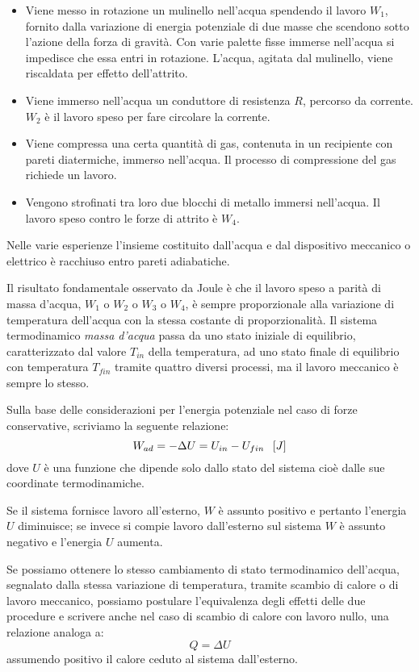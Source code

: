 \documentclass[class=book, crop=false, oneside, 12pt]{standalone}
\begin{document}
\begin{itemize}
    \item Viene messo in rotazione un mulinello nell'acqua spendendo il lavoro \(W_1\), fornito dalla variazione di energia potenziale di due masse che scendono sotto l'azione della forza di gravità. 
    Con varie palette fisse immerse nell'acqua si impedisce che essa entri in rotazione. 
    L'acqua, agitata dal mulinello, viene riscaldata per effetto dell'attrito. 
    \item Viene immerso nell'acqua un conduttore di resistenza \(R\), percorso da corrente. 
    \(W_2\) è il lavoro speso per fare circolare la corrente.
    \item Viene compressa una certa quantità di gas, contenuta in un recipiente con pareti diatermiche, immerso nell'acqua. 
    Il processo di compressione del gas richiede un lavoro.
    \item Vengono strofinati tra loro due blocchi di metallo immersi nell'acqua.  
    Il lavoro speso contro le forze di attrito è \(W_4\).
\end{itemize}
Nelle varie esperienze l'insieme costituito dall'acqua e dal dispositivo meccanico o elettrico è racchiuso entro pareti adiabatiche. 

Il risultato fondamentale osservato da Joule è che il lavoro speso a parità di massa d'acqua, \(W_1\) o \(W_2\) o \(W_3\) o \(W_4\), è sempre proporzionale alla variazione di temperatura dell'acqua con la stessa costante di proporzionalità.\newline
Il sistema termodinamico \emph{massa d'acqua} passa da uno stato iniziale di equilibrio, caratterizzato dal valore \(T_{in}\) della temperatura, ad uno stato finale di equilibrio con temperatura \(T_{fin}\) tramite quattro diversi processi, ma il lavoro meccanico è sempre lo stesso.

Sulla base delle considerazioni per l'energia potenziale nel caso di forze conservative, scriviamo la seguente relazione:
\begin{equation}
    W_{ad} = - \Delta U = U_{in} - U_{fin} \hspace{0.2cm} \left[J\right]
\end{equation}
dove \(U\) è una funzione che dipende solo dallo stato del sistema cioè dalle sue coordinate termodinamiche.

Se il sistema fornisce lavoro all'esterno, \(W\) è assunto positivo e pertanto l'energia \(U\) diminuisce; se invece si compie lavoro dall'esterno sul sistema \(W\) è assunto negativo e l'energia \(U\) aumenta.

Se possiamo ottenere lo stesso cambiamento di stato termodinamico dell'acqua, segnalato dalla stessa variazione di temperatura, tramite scambio di calore o di lavoro meccanico, possiamo postulare l'equivalenza degli effetti delle due procedure e scrivere anche nel caso di scambio di calore con lavoro nullo, una relazione analoga a:
\begin{equation}
    Q = \Delta U
\end{equation}
assumendo positivo il calore ceduto al sistema dall'esterno. 
\end{document}
